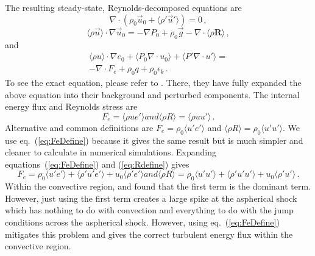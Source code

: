 \documentclass[twocolumn]{aastex6}
\begin{document}
The resulting steady-state, Reynolds-decomposed equations are
\begin{equation}
\nabla \cdot (\rho_0 \vec{u}_0 + \langle \rho' \vec{u}' \rangle) = 0 \, ,
\label{consmass}
\end{equation}
\begin{equation}
\langle \rho \vec{u} \rangle \cdot \nabla \vec{u}_0 = -\nabla P_0 + \rho_0 \vec{g} - \nabla \cdot \langle \rho \textbf{R} \rangle \, ,
\label{consmom}
\end{equation}
and
\begin{equation}
\begin{aligned}
  \langle \rho u \rangle \cdot \nabla e_0 + \langle P_0\nabla \cdot u_0 \rangle + \langle P' \nabla \cdot u' \rangle = \\ -\nabla \cdot F_e + \rho_0 q + \rho_0 \epsilon_k \, .
\label{consenergy}
\end{aligned}
\end{equation}
To see the exact equation, please refer to \citet{meakin07b}. There,
they have fully expanded the above equation into their background and
perturbed components. The internal energy flux and Reynolds stress are
\begin{subequations}
\begin{equation}
\label{eq:FeDefine}
F_e = \langle \rho u e' \rangle 
\end{equation}
and
\begin{equation}
\label{eq:Rdefine}
\langle \rho R \rangle = \langle \rho uu' \rangle \, .
\end{equation}
\end{subequations}
Alternative and common
  definitions are $F_e = \rho_0 \langle u' e' \rangle$ and $\langle \rho R \rangle = \rho_0 \langle  u'u' \rangle$.  We use eq.~(\ref{eq:FeDefine})
  because it gives the same result but is much
  simpler and cleaner to calculate in numerical simulations.
  Expanding equations~(\ref{eq:FeDefine}) and (\ref{eq:Rdefine}) gives
\begin{subequations}
\begin{equation}
F_e = \rho_0 \langle u' e' \rangle + \langle \rho' u' e' \rangle + u_0
  \langle \rho' e' \rangle 
\end{equation}
and
\begin{equation}  
\langle \rho R \rangle = \rho_0 \langle u' u' \rangle + \langle \rho' u' u' \rangle + u_0 \langle \rho' u' \rangle  \, .
\end{equation}
\end{subequations}
Within the convective region,
  \citet{murphy11b} and \citet{murphy13} found that the first term is
  the dominant term.  However, just using the first term creates a
  large spike at the aspherical shock which has nothing to do with
  convection and everything to do with the jump conditions across the aspherical
  shock.  However, using eq.~(\ref{eq:FeDefine}) mitigates this
  problem and gives the correct turbulent energy flux within the
  convective region.  
\end{document}

